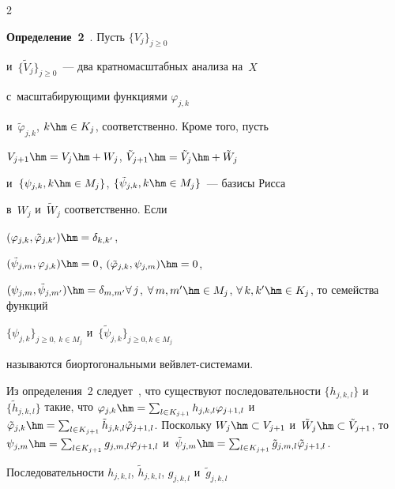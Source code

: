 \begin{multicols}{2}
\noindent


\textbf{Определение~2}~\cite{8-bos}. Пусть $\{V_j\}_{j\geq 0}$ 


и~$\{\tilde{V}_j\}_{j\geq0}$~--- два кратномасштабных анализа на~$X$ 


с~масштабирующими функциями $\varphi_{j,k}$ 


и~$\tilde{\varphi}_{j,k}$, $k\hm\in K_j$, соответственно. Кроме того, пусть 


$V_{j+1}\hm= V_j\hm+ W_j$, $\tilde{V}_{j+1} \hm= \tilde{V}_j\hm+ \tilde{W}_j$ 


и~$\{\psi_{j,k}, k\hm\in M_j\}$, $\{ \tilde{\psi}_{j,k}, k\hm\in M_j\}$~--- базисы Рисса 


в~$W_j$ и~$\tilde{W}_j$ соответственно. Если 


$(\varphi_{j,k},\tilde{\varphi}_{j,k^\prime})\hm= \delta_{k,k^\prime}$, 


$(\tilde{\psi}_{j,m}, \varphi_{j,k})\hm= 0$, $( \tilde{\varphi}_{j,k}, \psi_{j,m})\hm=0$, 


$(\psi_{j,m}, \tilde{\psi}_{j,m^\prime})\hm=\delta_{m,m^\prime} \forall\,j$, $\forall\,m, 


m^\prime\hm\in M_j$, $\forall\,k, k^\prime\hm\in K_j$, то семейства функций 


$\{\psi_{j,k}\}_{j\geq0,\ k\in M_j}$ и~$\{ \tilde{\psi}_{j,k}\}_{j\geq0, k\in M_j}$ 


называются би\-ор\-то\-го\-наль\-ны\-ми вейв\-лет-сис\-те\-мами.


  


  Из определения~2 следует~\cite{5-bos}, что существуют последовательности $\{ 


h_{j,k,l}\}$ и~$\{\tilde{h}_{j,k,l}\}$ такие, что $\varphi_{j,k}\hm= \sum\nolimits_{l\in 


K_{j+1}} h_{j,k,l}\varphi_{j+1,l}$ и~$\tilde{\varphi}_{j,k}\hm= \sum\nolimits_{l\in 


K_{j+1}} \tilde{h}_{j,k,l} \tilde{\varphi}_{j+1,l}$. Поскольку $W_j\hm\subset 


V_{j+1}$ и~$\tilde{W}_j\hm\subset \tilde{V}_{j+1}$, то $\psi_{j,m}\hm= 


\sum\nolimits_{l\in K_{j+1}} g_{j,m,l}\varphi_{j+1,l}$ и~$\tilde{\psi}_{j,m}\hm= 


\sum\nolimits_{l\in K_{j+1}} \tilde{g}_{j,m,l} \tilde{\varphi}_{j+1,l}$. 


Последовательности $h_{j,k,l}$, $\tilde{h}_{j,k,l}$, $g_{j,k,l}$ и~$\tilde{g}_{j,k,l}$ 



\end{multicols}
